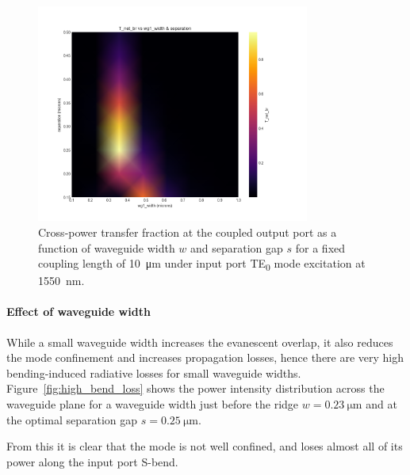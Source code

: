 \documentclass[10pt, a4paper]{article}
\begin{document}
\begin{figure}[h!]
  \centering
  \includegraphics[width=0.8\textwidth]{task3/sweep_plots/sweep_idx_2_sweep__wg1_width=0.1_1_8,_wg2_width=0.1_1_8,_separation=0.15_0.5_8_(matched_widths)_T_net_br_heatmap.png}
  \caption{Cross-power transfer fraction at the coupled output port as a function of waveguide width \(w\) and separation gap \(s\) for a fixed coupling length of \SI{10}{\um} under input port TE\textsubscript{0} mode excitation at \SI{1550}{\nm}.}
  \label{fig:2D_sweep_equal_wg_vs_sep}
\end{figure}

\paragraph{Effect of waveguide width}
While a small waveguide width increases the evanescent overlap,
it also reduces the mode confinement and increases propagation losses,
hence there are very high bending-induced radiative losses for small waveguide widths.
Figure~\ref{fig:high_bend_loss} shows the power intensity distribution across the waveguide plane
for a waveguide width just before the ridge \(w=\SI{0.23}{\um}\) and at the optimal separation gap \(s=\SI{0.25}{\um}\).

From this it is clear that the mode is not well confined, and loses almost all of its power along the input port S-bend.
\end{document}
